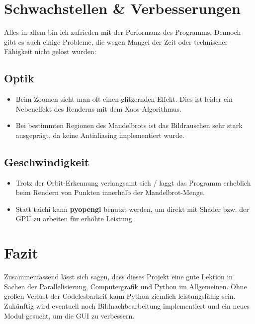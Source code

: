 \documentclass{article}
\begin{document}
\section{Schwachstellen \& Verbesserungen}
Alles in allem bin ich zufrieden mit der Performanz des Programms. Dennoch gibt es auch einige Probleme, die wegen Mangel der Zeit oder technischer Fähigkeit nicht gelöst wurden:
\subsection{Optik}
\begin{itemize}
\item Beim Zoomen sieht man oft einen glitzernden Effekt. Dies ist leider ein Nebeneffekt des Renderns mit dem Xaos-Algorithmus.
\item Bei bestimmten Regionen des Mandelbrots ist das Bildrauschen sehr stark ausgeprägt, da keine Antialiasing implementiert wurde.
\end{itemize}

\subsection{Geschwindigkeit}
\begin{itemize}
\item Trotz der Orbit-Erkennung verlangsamt sich / laggt das Programm erheblich beim Rendern von Punkten innerhalb der Mandelbrot-Menge.
\item Statt taichi kann \textbf{pyopengl} benutzt werden, um direkt mit Shader bzw. der GPU zu arbeiten für erhöhte Leistung.

\end{itemize}

\section{Fazit}
Zusammenfassend lässt sich sagen, dass dieses Projekt eine gute Lektion in Sachen der Parallelisierung, Computergrafik und Python im Allgemeinen. Ohne großen Verlust der Codelesbarkeit kann Python ziemlich leistungsfähig sein. Zukünftig wird eventuell noch Bildnachbearbeitung implementiert und ein neues Modul gesucht, um die GUI zu verbessern.
\printbibliography
\end{document}
